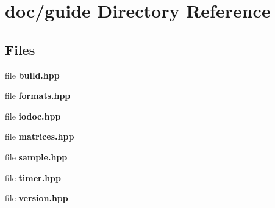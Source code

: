 \section{doc/guide Directory Reference}
\label{dir_5d70a24da6601672a505ee4a58a10c27}
\subsection*{Files}
\begin{DoxyCompactItemize}
\item 
file {\bf build.\+hpp}
\item 
file {\bf formats.\+hpp}
\item 
file {\bf iodoc.\+hpp}
\item 
file {\bf matrices.\+hpp}
\item 
file {\bf sample.\+hpp}
\item 
file {\bf timer.\+hpp}
\item 
file {\bf version.\+hpp}
\end{DoxyCompactItemize}
